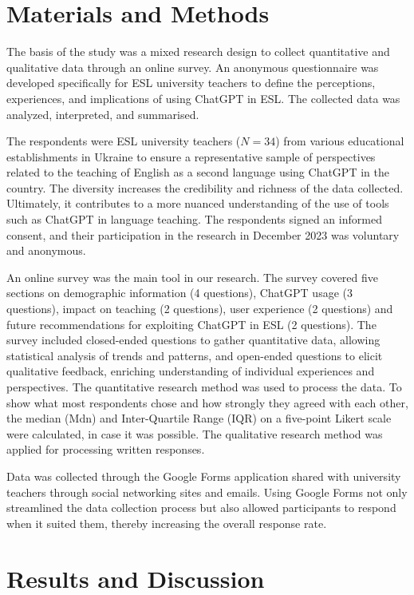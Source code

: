 \documentclass[english]{textolivre}
\begin{document}
\section{Materials and Methods}
The basis of the study was a mixed research design to collect quantitative and qualitative data through an online survey. An anonymous questionnaire was developed specifically for ESL university teachers to define the perceptions, experiences, and implications of using ChatGPT in ESL. The collected data was analyzed, interpreted, and summarised.

The respondents were ESL university teachers ($N=34$) from various educational establishments in Ukraine to ensure a representative sample of perspectives related to the teaching of English as a second language using ChatGPT in the country. The diversity increases the credibility and richness of the data collected. Ultimately, it contributes to a more nuanced understanding of the use of tools such as ChatGPT in language teaching. The respondents signed an informed consent, and their participation in the research in December 2023 was voluntary and anonymous.

An online survey was the main tool in our research. The survey covered five sections on demographic information (4 questions), ChatGPT usage (3 questions), impact on teaching (2 questions), user experience (2 questions) and future recommendations for exploiting ChatGPT in ESL (2 questions). The survey included closed-ended questions to gather quantitative data, allowing statistical analysis of trends and patterns, and open-ended questions to elicit qualitative feedback, enriching understanding of individual experiences and perspectives. The quantitative research method was used to process the data. To show what most respondents chose and how strongly they agreed with each other, the median (Mdn) and Inter-Quartile Range (IQR) on a five-point Likert scale were calculated, in case it was possible. The qualitative research method was applied for processing written responses.

Data was collected through the Google Forms application shared with university teachers through social networking sites and emails. Using Google Forms not only streamlined the data collection process but also allowed participants to respond when it suited them, thereby increasing the overall response rate.

\section{Results and Discussion}
\end{document}
